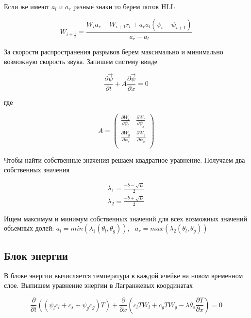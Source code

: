 \documentclass[12pt,a4paper]{article}
\newcommand{\pd}[2]{\frac{\partial #1}{\partial #2}}
\begin{document}
Если же имеют $a_l$ и $a_r$ разные знаки то берем поток HLL

\begin{equation}
W_{i+\frac12} = \frac{W_i a_r - W_{i+1} r_l + a_r a_l (\psi_i - \psi_{i+1})}{a_r - a_l}
\end{equation}

За скорости распространения разрывов берем максимально и минимально возможную скорость звука. Запишем систему ввиде 

\begin{equation}
\frac{\partial \vec\psi}{\partial t}  + A \frac{\partial \vec\psi}{\partial x} = 0
\end{equation}

где

\begin{equation}
A = \begin{pmatrix}
 \frac{\partial W_l}{\partial \psi_l} &  \frac{\partial W_l}{\partial \psi_g} \\
 \frac{\partial W_g}{\partial \psi_l} &  \frac{\partial W_g}{\partial \psi_g} \\
\end{pmatrix}	
\end{equation}

Чтобы найти собственные значения решаем квадратное уравнение. Получаем два собственных значения

\begin{equation}
\begin{aligned}
\lambda_1 = \frac{- b - \sqrt{D}}{2}\\
\lambda_2 = \frac{- b + \sqrt{D}}{2}
\end{aligned}
\end{equation}

Ищем максимум и минимум собственных значений для всех возможных значений объемных долей: $a_l = min(\lambda_1(\theta_l, \theta_g)), \text{ } a_r = max(\lambda_2(\theta_l, \theta_g))$

\subsection{Блок энергии}
В блоке энергии вычисляется температура в каждой ячейке на новом временном слое. Выпишем уравнение энергии в Лагранжевых координатах

\begin{equation*}
\pd{} t \left((\psi_l c_l + c_s + \psi_g c_g)T\right) + \pd{} x \left(c_l T W_l + c_g T W_g - \lambda \theta_s \pd T x\right) = 0
\end{equation*}
\end{document}
